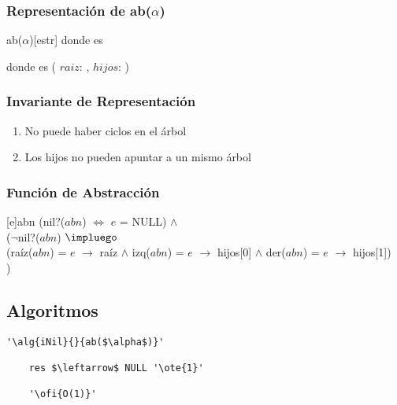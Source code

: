 	\subsubsection{Representación de ab($\alpha$)}

	\begin{Estructura}{ab($\alpha$)}[estr]
		\- \- \- \- donde  es 

		\- \- \- \- donde  es
			(
				$raiz$: \TipoVariable{$\alpha$},
				$hijos$: 
			)

	\end{Estructura}

	\subsubsection{Invariante de Representación}

		\renewcommand{\labelenumi}{(\Roman{enumi})}

		\begin{enumerate}
			\item No puede haber ciclos en el árbol
			\item Los hijos no pueden apuntar a un mismo árbol
		\end{enumerate}

	\subsubsection{Función de Abstracción}

		[e]{abn}{
			(nil?($abn$) $\Leftrightarrow$ $e$ = NULL) $\land$ \\
			($\neg$nil?($abn$) $\impluego$ \\
			\- (raíz($abn$) = $e$ $\rightarrow$ raíz $\land$
				izq($abn$) = $e$ $\rightarrow$ hijos[0] $\land$
				der($abn$) = $e$ $\rightarrow$ hijos[1]) \\
			)
		}

\subsection{Algoritmos}
	\lstset{style=alg}

	\begin{lstlisting}[mathescape]
	'\alg{iNil}{}{ab($\alpha$)}'

	res $\leftarrow$ NULL '\ote{1}'

	'\ofi{O(1)}'
	\end{lstlisting}

